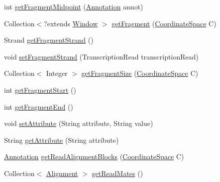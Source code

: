 \begin{DoxyCompactItemize}
\item 
int \hyperlink{classumms_1_1core_1_1alignment_1_1_abstract_paired_end_alignment_aa013b3820d63aa91253df3d83bc24881}{get\+Fragment\+Midpoint} (\hyperlink{interfaceumms_1_1core_1_1annotation_1_1_annotation}{Annotation} annot)
\item 
Collection$<$?extends \hyperlink{interfaceumms_1_1core_1_1feature_1_1_window}{Window} $>$ \hyperlink{classumms_1_1core_1_1alignment_1_1_abstract_paired_end_alignment_a210850190a8e4e98c2ce56c842f0b80e}{get\+Fragment} (\hyperlink{interfaceumms_1_1core_1_1coordinatesystem_1_1_coordinate_space}{Coordinate\+Space} C)
\item 
Strand \hyperlink{classumms_1_1core_1_1alignment_1_1_abstract_paired_end_alignment_a7272dda055f8425c3f85302fd96cfa5b}{get\+Fragment\+Strand} ()
\item 
void \hyperlink{classumms_1_1core_1_1alignment_1_1_abstract_paired_end_alignment_adb6292c83fa8e285c0350584f196c5fe}{set\+Fragment\+Strand} (Transcription\+Read transcription\+Read)
\item 
Collection$<$ Integer $>$ \hyperlink{classumms_1_1core_1_1alignment_1_1_abstract_paired_end_alignment_ab6d963d0dd6bd87e8c98fadf6e185f2e}{get\+Fragment\+Size} (\hyperlink{interfaceumms_1_1core_1_1coordinatesystem_1_1_coordinate_space}{Coordinate\+Space} C)
\item 
int \hyperlink{classumms_1_1core_1_1alignment_1_1_abstract_paired_end_alignment_a64eda682e150d7be478dadb30ec43c56}{get\+Fragment\+Start} ()
\item 
int \hyperlink{classumms_1_1core_1_1alignment_1_1_abstract_paired_end_alignment_af16e4a059527adbdf5ac66350cab42c5}{get\+Fragment\+End} ()
\item 
void \hyperlink{classumms_1_1core_1_1alignment_1_1_abstract_paired_end_alignment_a4ebdcbbfbfd734c2298f015e4d8cfefb}{set\+Attribute} (String attribute, String value)
\item 
String \hyperlink{classumms_1_1core_1_1alignment_1_1_abstract_paired_end_alignment_a6ed9ab1244c6e54bc43ca6cb24f084af}{get\+Attribute} (String attribute)
\item 
\hyperlink{interfaceumms_1_1core_1_1annotation_1_1_annotation}{Annotation} \hyperlink{classumms_1_1core_1_1alignment_1_1_abstract_paired_end_alignment_a54e350bcbc168434f78ab6c2417c5eb4}{get\+Read\+Alignment\+Blocks} (\hyperlink{interfaceumms_1_1core_1_1coordinatesystem_1_1_coordinate_space}{Coordinate\+Space} C)
\item 
Collection$<$ \hyperlink{interfaceumms_1_1core_1_1alignment_1_1_alignment}{Alignment} $>$ \hyperlink{classumms_1_1core_1_1alignment_1_1_abstract_paired_end_alignment_adeb9200fe5412ef288d4715b1622323c}{get\+Read\+Mates} ()

\end{DoxyCompactItemize}
